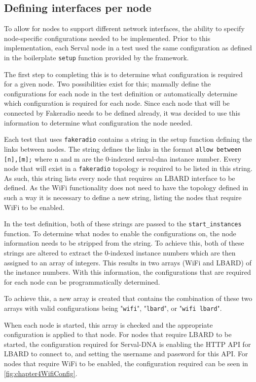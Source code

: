 \subsection{Defining interfaces per node}
\label{subsection:DefiningInterfaces}
To allow for nodes to support different network interfaces, the ability to specify node-specific configurations needed to be implemented.
Prior to this implementation, each Serval node in a test used the same configuration as defined in the boilerplate \texttt{setup} function provided by the framework.

The first step to completing this is to determine what configuration is required for a given node.
Two possibilities exist for this; manually define the configurations for each node in the test definition or automatically determine which configuration is required for each node.
Since each node that will be connected by Fakeradio needs to be defined already, it was decided to use this information to determine what configuration the node needed.

Each test that uses \texttt{fakeradio} contains a string in the setup function defining the links between nodes.
The string defines the links in the format \texttt{allow between [n],[m];} where n and m are the 0-indexed serval-dna instance number.
Every node that will exist in a \texttt{fakeradio} topology is required to be listed in this string.
As such, this string lists every node that requires an LBARD interface to be defined.
As the WiFi functionality does not need to have the topology defined in such a way it is necessary to define a new string, listing the nodes that require WiFi to be enabled. 

In the test definition, both of these strings are passed to the \texttt{start\_instances} function.
To determine what nodes to enable the configurations on, the node information needs to be stripped from the string.
To achieve this, both of these strings are altered to extract the 0-indexed instance numbers which are then assigned to an array of integers.
This results in two arrays (WiFi and LBARD) of the instance numbers.
With this information, the configurations that are required for each node can be programmatically determined.

To achieve this, a new array is created that contains the combination of these two arrays with valid configurations being "\texttt{wifi}", "\texttt{lbard}", or "\texttt{wifi lbard}".

When each node is started, this array is checked and the appropriate configuration is applied to that node.
For nodes that require LBARD to be started, the configuration required for Serval-DNA is enabling the HTTP API for LBARD to connect to, and setting the username and password for this API.
For nodes that require WiFi to be enabled, the configuration required can be seen in \figurename{ \ref{fig:chapter4WifiConfig}}.

